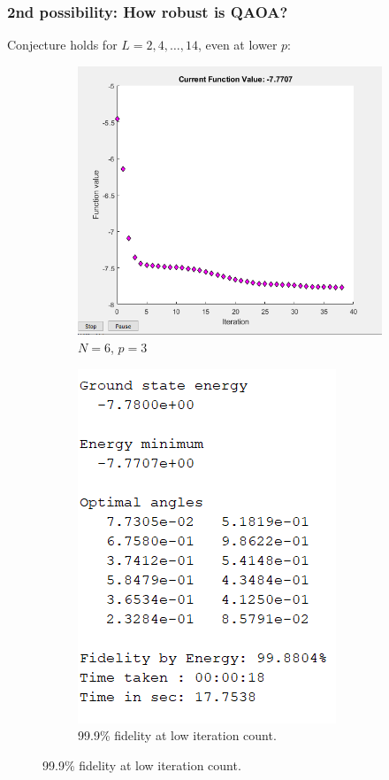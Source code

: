 \documentclass{beamer}
\theoremstyle{definition}
\begin{document}
\begin{frame}
\frametitle{2nd possibility: How robust is QAOA?}



Conjecture holds for $L = 2,4,\dots, 14$, even at lower $p$:



\begin{figure}[!htb]
	\centering
	\begin{subfigure}{0.5 \textwidth}
		\centering
		\includegraphics[scale=0.35]{N_6_p_3.PNG}
		\caption{$N=6$, $p=3$}
	\end{subfigure}%
	\begin{subfigure}{0.5 \textwidth}
		\centering
		\includegraphics[scale=0.46]{N_6_p_3_out}
		\caption{99.9\% fidelity at low iteration count.}
	\end{subfigure}
\end{figure}

\end{frame}
\end{document}
